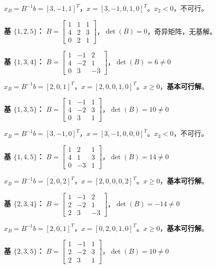 \documentclass[12pt,a4paper]{article}
\begin{document}
$x_B = B^{-1}b = [3, -1, 1]^T$，$x = [3, -1, 0, 1, 0]^T$。$x_2 < 0$，不可行。

\textbf{基 $\{1,2,5\}$：} $B = \left[\begin{array}{ccc} 1 & 1 & 1 \\ 4 & 2 & 3 \\ 0 & 2 & 1 \end{array}\right]$，$\det(B) = 0$，奇异矩阵，无基解。

\textbf{基 $\{1,3,4\}$：} $B = \left[\begin{array}{ccc} 1 & -1 & 2 \\ 4 & -2 & 1 \\ 0 & 3 & -3 \end{array}\right]$，$\det(B) = 6 \neq 0$

$x_B = B^{-1}b = [2, 0, 1]^T$，$x = [2, 0, 0, 1, 0]^T$。$x \geq 0$，\textbf{基本可行解}。

\textbf{基 $\{1,3,5\}$：} $B = \left[\begin{array}{ccc} 1 & -1 & 1 \\ 4 & -2 & 3 \\ 0 & 3 & 1 \end{array}\right]$，$\det(B) = 10 \neq 0$

$x_B = B^{-1}b = [3, -1, 0]^T$，$x = [3, -1, 0, 0, 0]^T$。$x_3 < 0$，不可行。

\textbf{基 $\{1,4,5\}$：} $B = \left[\begin{array}{ccc} 1 & 2 & 1 \\ 4 & 1 & 3 \\ 0 & -3 & 1 \end{array}\right]$，$\det(B) = 14 \neq 0$

$x_B = B^{-1}b = [2, 0, 2]^T$，$x = [2, 0, 0, 0, 2]^T$。$x \geq 0$，\textbf{基本可行解}。

\textbf{基 $\{2,3,4\}$：} $B = \left[\begin{array}{ccc} 1 & -1 & 2 \\ 2 & -2 & 1 \\ 2 & 3 & -3 \end{array}\right]$，$\det(B) = -14 \neq 0$

$x_B = B^{-1}b = [2, 0, 1]^T$，$x = [0, 2, 0, 1, 0]^T$。$x \geq 0$，\textbf{基本可行解}。

\textbf{基 $\{2,3,5\}$：} $B = \left[\begin{array}{ccc} 1 & -1 & 1 \\ 2 & -2 & 3 \\ 2 & 3 & 1 \end{array}\right]$，$\det(B) = 10 \neq 0$
\end{document}
